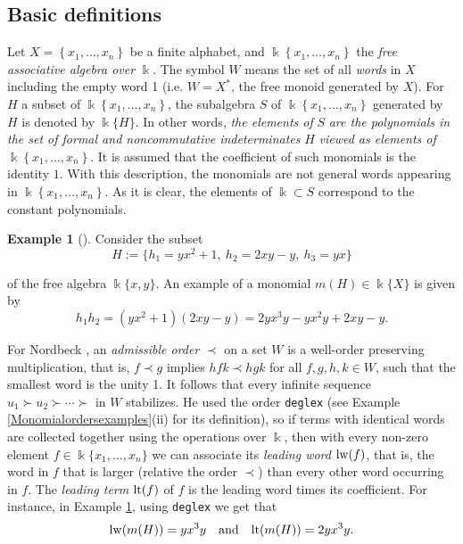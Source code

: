 \documentclass{amsart}
\theoremstyle{definition}
\newtheorem{example}[theorem]{Example}
\theoremstyle{remark}
\numberwithin{equation}{section}
\begin{document}
\subsection{Basic definitions}

Let $X = \left\{x_1, \ldots, x_n\right\}$ be a finite alphabet, and \linebreak $\Bbbk\left\{x_1, \ldots, x_n\right\}$ the {\em free associative algebra over} $\Bbbk$. The symbol $W$ means the set of all {\em words} in $X$ including the empty word 1 (i.e. $W=X^*$, the free monoid generated by $X$). For $H$ a subset of $\Bbbk \left\{x_1, \ldots, x_n\right\}$, the subalgebra $S$ of $\Bbbk \left\{x_1, \ldots, x_n\right\}$ generated by $H$ is denoted by $\Bbbk \{H\}$. In other words, {\em the elements of} $S$ {\em are the polynomials in the set of formal and noncommutative indeterminates} $H$ {\em viewed as elements of} $\Bbbk\left\{x_1, \ldots, x_n\right\}$. It is assumed that the coefficient of such monomials is the identity $1$. With this description, the monomials are not general words appearing in $\Bbbk \left\{x_1,  \ldots, x_n\right\}$. As it is clear, the elements of $\Bbbk \subset S$ correspond to the constant polynomials.

\begin{example}[{\cite[Example 1]{Nordbeck1998}}]\label{Nordbeck1998Example1}
    Consider the subset 
    $$
    H := \{ h_1 = yx^2 + 1,\ h_2 = 2xy - y,\ h_3 = yx\}
    $$ 
    
    of the free algebra $\Bbbk \{x, y\}$. An example of a monomial $m(H) \in \Bbbk \{X\}$ is given by 
    $$
    h_1 h_2 = (yx^2 + 1) (2xy - y) = 2yx^3y - yx^2y + 2xy - y.
    $$
\end{example}

For Nordbeck \cite{Nordbeck1998}, an {\em admissible order} $\prec$ on a set $W$ is a well-order preserving multiplication, that is, $ f \prec g $ implies $h f k \prec h g k$ for all $f, g, h, k \in W$, such that the smallest word is the unity 1. It follows that every infinite sequence $u_1 \succ u_2 \succ \dotsb \succ $ in $W$ stabilizes. He used the order \texttt{deglex} (see Example \ref{Monomialordersexamples}(ii) for its definition), so if terms with identical words are collected together using the operations over $\Bbbk$, then with every non-zero element $f\in \Bbbk \{x_1, \dotsc, x_n\}$ we can associate its {\em leading word} ${\rm lw}(f)$, that is, the word in $f$ that is larger (relative the order $\prec$) than every other word occurring in $f$. The {\em leading term} ${\rm lt}(f)$ of $f$ is the leading word times its coefficient. For instance, in Example \ref{Nordbeck1998Example1}, using \texttt{deglex} we get that
$$
{\rm lw}(m(H)) = yx^3y \quad {\rm and} \quad {\rm lt}(m(H)) = 2yx^3y.
$$ 
\end{document}
